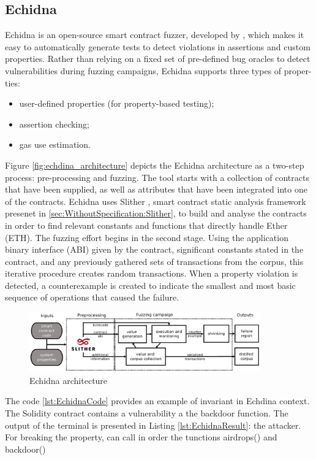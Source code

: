 \subsection{Echidna}
\label{sec:Specification:Echidna}
Echidna is an open-source smart contract fuzzer, developed by \citet{Echidna}, which makes it easy to automatically generate tests to detect violations in
assertions and custom properties.
Rather than relying on a fixed set of pre-defined bug oracles to detect vulnerabilities
during fuzzing campaigns, Echidna supports three types of proper-
ties: 
\begin{itemize}
    \item user-defined properties (for property-based testing);
    \item assertion checking;
    \item gas use estimation.
\end{itemize}

Figure \autoref{fig:echdina_architecture} depicts the Echidna architecture as a two-step process: pre-processing and fuzzing.
The tool starts with a collection of contracts that have been supplied, as well as attributes that have been integrated into one of the contracts.
Echidna uses Slither , smart contract static analysis framework presenet in \autoref{sec:WithoutSpecification:Slither}, to build and analyse the contracts in order to find relevant constants and functions that directly handle Ether (ETH).
The fuzzing effort begins in the second stage. 
Using the application binary interface (ABI) given by the contract, significant constants stated in the contract, 
and any previously gathered sets of transactions from the corpus, this iterative procedure creates random transactions. 
When a property violation is detected, a counterexample is created to indicate the smallest and most basic sequence of operations that caused the failure. 

\begin{figure}
    \centering
    \includegraphics[width=10cm]{logos/echidna.png}
    \caption{Echidna architecture}
    \label{fig:echdina_architecture}
\end{figure}

The code \autoref{lst:EchidnaCode} provides an example of invariant in Echdina context. The Solidity contract contains a vulnerability a the backdoor function. The output of the terminal is presented in Listing \autoref{lst:EchidnaResult}: the attacker. For breaking the property, can call in order the tunctions airdrops() and backdoor()

